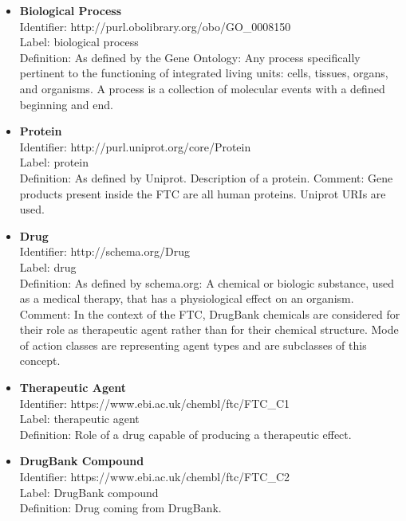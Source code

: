 \documentclass{bioinfo}
\begin{document}
\begin{itemize}
\item \textbf{Biological Process} \\
Identifier: http://purl.obolibrary.org/obo/GO\_0008150 \\
Label: biological process \\
Definition: As defined by the Gene Ontology: Any process specifically pertinent to the functioning of 
integrated living units: cells, tissues, organs, and organisms. A process is a collection of molecular 
events with a defined beginning and end.
\end{itemize}

\begin{itemize}
\item \textbf{Protein} \\
Identifier: http://purl.uniprot.org/core/Protein \\
Label: protein \\
Definition: As defined by Uniprot. Description of a protein.
Comment: Gene products present inside the FTC are all human proteins. Uniprot URIs are used.
\end{itemize}

\begin{itemize}
\item \textbf{Drug} \\
Identifier: http://schema.org/Drug \\
Label: drug \\
Definition: As defined by schema.org: A chemical or biologic substance, used as a medical therapy, that has a 
physiological effect on an organism. \\
Comment: In the context of the FTC, DrugBank chemicals are considered for their role as therapeutic agent 
rather than for their chemical structure. Mode of action classes are representing agent types and are subclasses of this concept.
\end{itemize}

\begin{itemize}
\item \textbf{Therapeutic Agent} \\
Identifier: https://www.ebi.ac.uk/chembl/ftc/FTC\_C1 \\
Label: therapeutic agent \\
Definition: Role of a drug capable of producing a therapeutic effect.
\end{itemize}

\begin{itemize}
\item \textbf{DrugBank Compound} \\
Identifier: https://www.ebi.ac.uk/chembl/ftc/FTC\_C2 \\
Label: DrugBank compound \\
Definition: Drug coming from DrugBank.
\end{itemize}
\end{document}
